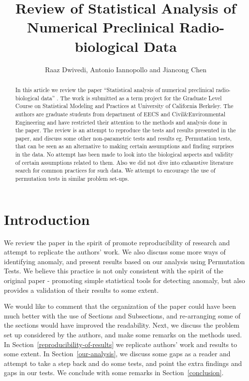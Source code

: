 \documentclass{article}
\title{Review of Statistical Analysis of Numerical Preclinical Radio-biological Data}
\author{Raaz Dwivedi,  Antonio Iannopollo and Jiancong Chen}
\begin{document}
    
    
    \maketitle
    
    

\begin{abstract}
In this article we review the paper ``Statistical analysis of numerical
preclinical radio-biological data'' \cite{pitt2016statistical}. The work is submitted as a term
project for the Graduate Level Course on Statistical Modeling and
Practices at University of California Berkeley. The authors are graduate
students from department of EECS and Civil\&Environmental Engineering
and have restricted their attention to the methods and analysis done in
the paper. The review is an attempt to reproduce the tests and results
presented in the paper, and discuss some other non-parametric tests and
results eg. Permutation tests, that can be seen as an alternative to
making certain assumptions and finding surprises in the data. No attempt
has been made to look into the biological aspects and validity of
certain assumptions related to them. Also we did not dive into exhaustive literature search for common practices for such data. We attempt to encourage the use of permutation tests in similar problem set-ups.
\end{abstract}

\section{Introduction} %
\label{sec:introduction}


We review the paper in the spirit of promote reproducibility of research and attempt to replicate the authors' work. We also discuss some more ways of identifying anomaly, and present results based on our analysis using Permutation Tests. We believe this practice is not only consistent with the spirit of the original paper - promoting simple statistical tools for detecting anomaly, but also provides a validation of their results to some extent.

We would like to comment that the organization of the paper could have been much better with the use of Sections and Subsections, and re-arranging some of the sections would have improved the readability. Next, we discuss the problem set up considered by the authors, and make some remarks on the methods used. In Section~\ref{reproducibility-of-results} we replicate authors' work and results to some extent. In Section~\ref{our-analysis}, we discuss some gaps as a reader and attempt to take a step back and do some tests, and point the extra findings and gaps in our tests. We conclude with some remarks in Section~\ref{conclusion}.
\end{document}
